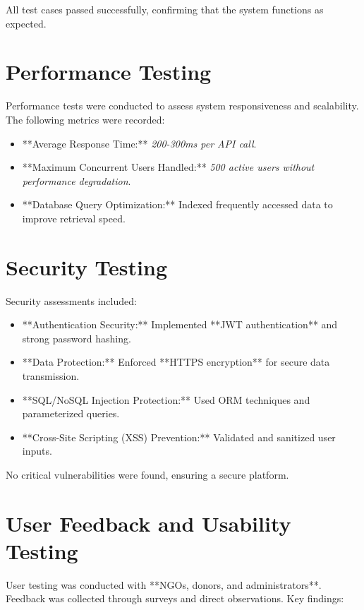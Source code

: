 All test cases passed successfully, confirming that the system functions as expected.

\section{Performance Testing}
Performance tests were conducted to assess system responsiveness and scalability. The following metrics were recorded:

\begin{itemize}
    \item **Average Response Time:** \textit{200-300ms per API call}.
    \item **Maximum Concurrent Users Handled:** \textit{500 active users without performance degradation}.
    \item **Database Query Optimization:** Indexed frequently accessed data to improve retrieval speed.
\end{itemize}

\section{Security Testing}
Security assessments included:

\begin{itemize}
    \item **Authentication Security:** Implemented **JWT authentication** and strong password hashing.
    \item **Data Protection:** Enforced **HTTPS encryption** for secure data transmission.
    \item **SQL/NoSQL Injection Protection:** Used ORM techniques and parameterized queries.
    \item **Cross-Site Scripting (XSS) Prevention:** Validated and sanitized user inputs.
\end{itemize}

No critical vulnerabilities were found, ensuring a secure platform.

\section{User Feedback and Usability Testing}
User testing was conducted with **NGOs, donors, and administrators**. Feedback was collected through surveys and direct observations. Key findings:

